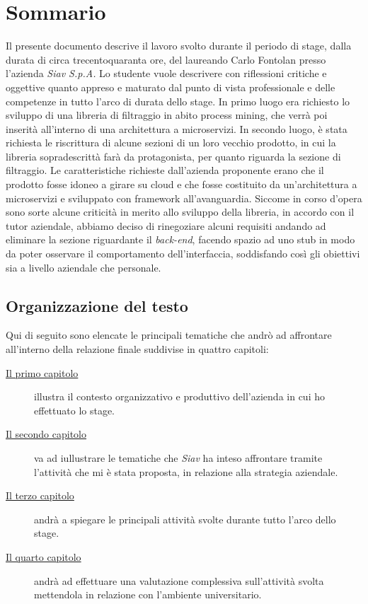 
\cleardoublepage
{}
{}
\begingroup
\let\clearpage\relax
\let\cleardoublepage\relax
\let\cleardoublepage\relax

\chapter*{Sommario}

Il presente documento descrive il lavoro svolto durante il periodo di stage, dalla durata di circa trecentoquaranta ore, del laureando Carlo Fontolan presso l'azienda \textit{Siav S.p.A.}
Lo studente vuole descrivere con riflessioni critiche e oggettive quanto appreso e maturato dal punto di vista professionale e delle competenze in tutto l'arco di durata dello stage.
In primo luogo era richiesto lo sviluppo di una libreria di filtraggio in abito process mining, che verrà poi inserità all'interno di una architettura a microservizi.
In secondo luogo, è stata richiesta le riscrittura di alcune sezioni di un loro vecchio prodotto, in cui la libreria sopradescrittà farà da protagonista, per quanto riguarda la sezione di filtraggio. Le caratteristiche richieste dall’azienda proponente erano che il prodotto fosse idoneo a girare su cloud e che fosse costituito da un’architettura a microservizi e sviluppato con framework all'avanguardia.
Siccome in corso d'opera sono sorte alcune criticità in merito allo sviluppo della libreria, in accordo con il tutor aziendale, abbiamo deciso di rinegoziare alcuni requisiti andando ad eliminare la sezione riguardante il  \textit{back-end}, facendo spazio ad uno stub in modo da poter osservare il comportamento dell'interfaccia, soddisfando così gli obiettivi sia a livello aziendale che personale. 
\section*{Organizzazione del testo}
Qui di seguito sono elencate le principali tematiche che andrò ad affrontare all'interno della relazione finale suddivise in quattro capitoli:
\begin{description}
	\item[{\hyperref[cap:il-contesto-aziendale]{Il primo capitolo}}] illustra il contesto organizzativo e produttivo dell'azienda in cui ho effettuato lo stage. 
	\item[{\hyperref[cap:stage interno della strategia aziendale]{Il secondo capitolo}}] va ad iullustrare le tematiche che \textit{Siav} ha inteso affrontare tramite l'attività che mi è stata proposta, in relazione alla strategia aziendale.
	\item[{\hyperref[cap:Resoconto dello stage]{Il terzo capitolo}}] andrà a spiegare le principali attività svolte durante tutto l'arco dello stage.
	\item[{\hyperref[cap:valutazione-retrospettiva]{Il quarto capitolo}}] andrà ad effettuare una valutazione complessiva sull'attività svolta mettendola in relazione con l'ambiente universitario.
\end{description}
\newpage
